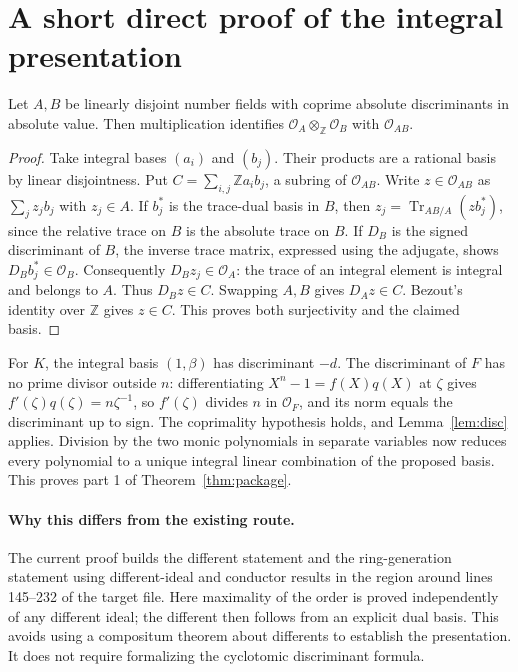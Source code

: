 \documentclass[11pt]{article}
\newcommand{\Z}{\mathbb Z}\newcommand{\Q}{\mathbb Q}\newcommand{\F}{\mathbb F}\newcommand{\OO}{\mathcal O}\newcommand{\Tr}{\operatorname{Tr}}\newcommand{\ord}{\operatorname{ord}}\newcommand{\lcm}{\operatorname{lcm}}\newcommand{\codiff}{\mathfrak D^{-1}}\newcommand{\src}[2]{\href{https://github.com/VladimirReshetnikov/ProveIt/blob/fd695fd462aa31b25af3335e2a9c3b6e014b055f/Analysis/GeneralizedRiemannHypothesis/Lean/grh/src/#1}{#2}}
\begin{document}
\section{A short direct proof of the integral presentation}
\begin{lemma}\label{lem:disc}
Let $A,B$ be linearly disjoint number fields with coprime absolute discriminants in absolute value. Then multiplication identifies $\OO_A\otimes_{\Z}\OO_B$ with $\OO_{AB}$.
\end{lemma}
\begin{proof}
Take integral bases $(a_i)$ and $(b_j)$. Their products are a rational basis by linear disjointness. Put $C=\sum_{i,j}\Z a_i b_j$, a subring of $\OO_{AB}$. Write $z\in\OO_{AB}$ as $\sum_j z_j b_j$ with $z_j\in A$. If $b_j^*$ is the trace-dual basis in $B$, then $z_j=\Tr_{AB/A}(z b_j^*)$, since the relative trace on $B$ is the absolute trace on $B$. If $D_B$ is the signed discriminant of $B$, the inverse trace matrix, expressed using the adjugate, shows $D_Bb_j^*\in\OO_B$. Consequently $D_Bz_j\in\OO_A$: the trace of an integral element is integral and belongs to $A$. Thus $D_Bz\in C$. Swapping $A,B$ gives $D_A z\in C$. Bezout's identity over $\Z$ gives $z\in C$. This proves both surjectivity and the claimed basis.
\end{proof}
For $K$, the integral basis $(1,\beta)$ has discriminant $-d$. The discriminant of $F$ has no prime divisor outside $n$: differentiating $X^n-1=f(X)q(X)$ at $\zeta$ gives $f'(\zeta)q(\zeta)=n\zeta^{-1}$, so $f'(\zeta)$ divides $n$ in $\OO_F$, and its norm equals the discriminant up to sign. The coprimality hypothesis holds, and Lemma~\ref{lem:disc} applies. Division by the two monic polynomials in separate variables now reduces every polynomial to a unique integral linear combination of the proposed basis. This proves part 1 of Theorem~\ref{thm:package}.

\paragraph{Why this differs from the existing route.} The current proof builds the different statement and the ring-generation statement using different-ideal and conductor results in the region around lines 145--232 of the target file. Here maximality of the order is proved independently of any different ideal; the different then follows from an explicit dual basis. This avoids using a compositum theorem about differents to establish the presentation. It does not require formalizing the cyclotomic discriminant formula.
\end{document}
